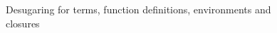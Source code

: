 \begin{figure}
\begin{minipage}[t]{0.48\textwidth}
{\begin{smathpar}
      \end{smathpar}
      }
   \end{minipage}%
   \hspace{2mm}%
   \begin{minipage}[t]{0.48\textwidth}
      {\small \flushleft {}
         \begin{smathpar}
            {
                   \desugar {}
            }
         \end{smathpar}
      }
   \end{minipage}
   \caption{Desugaring for terms, function definitions, environments and closures}
   \label{fig:desugar}
\end{figure}

